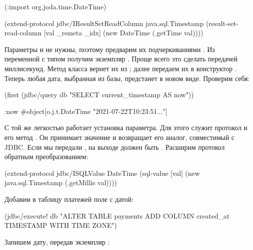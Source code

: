 \begin{english}
  \begin{clojure/lines}
(:import org.joda.time.DateTime)

(extend-protocol jdbc/IResultSetReadColumn
  java.sql.Timestamp
  (result-set-read-column [val _rsmeta _idx]
    (new DateTime (.getTime val))))
  \end{clojure/lines}
\end{english}

Параметры  и  не нужны, поэтому предварим их подчеркиваниями . Из переменной  с типом  получим экземпляр . Проще всего это сделать передачей миллисекунд. Метод  класса  вернет их из ; далее передаем их в конструктор . Теперь любая дата, выбранная из базы, предстанет в новом виде. Проверим себя:

\begin{english}
  \begin{clojure}
(first
  (jdbc/query db "SELECT current_timestamp AS now"))

{:now #object[o.j.t.DateTime "2021-07-22T10:23:51..."]}
  \end{clojure}
\end{english}

С той же легкостью работает установка параметра. Для этого служит протокол  и его метод . Он принимает значение и возвращает его аналог, совместимый с JDBC. Если мы передали , на выходе должен быть . Расширим протокол обратным преобразованием:

\begin{english}
  \begin{clojure}
(extend-protocol jdbc/ISQLValue
  DateTime
  (sql-value [val]
    (new java.sql.Timestamp (.getMillis val))))
  \end{clojure}
\end{english}

Добавим в таблицу платежей поле с датой:

\begin{english}
  \begin{clojure}
(jdbc/execute!
  db "ALTER TABLE payments
      ADD COLUMN created_at TIMESTAMP WITH TIME ZONE")
  \end{clojure}
\end{english}

Запишем дату, передав экземпляр :

